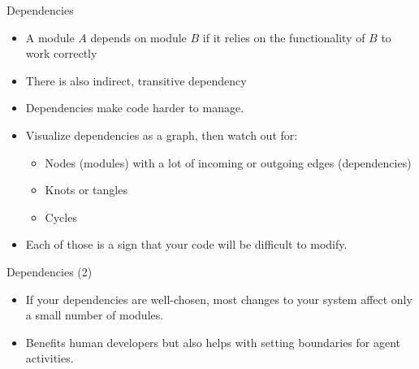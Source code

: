 \documentclass[
ps,
]{prosper}
\begin{document}
\begin{slide}{Dependencies}

\begin{itemize}

\item A module $A$ depends on module $B$ if it relies on the functionality of $B$ to
  work correctly

\item There is also indirect, transitive dependency

\item Dependencies make code harder to manage.

\item Visualize dependencies as a graph, then watch out for:

  \begin{itemize}
  
  \item Nodes (modules) with a lot of incoming or outgoing edges (dependencies)

  \item Knots or tangles

  \item Cycles
    
  \end{itemize}

\item Each of those is a sign that your code will be difficult to modify.
  
\end{itemize}
  
\end{slide}

\begin{slide}{Dependencies (2)}

\begin{itemize}

\item If your dependencies are well-chosen, most changes to your system affect only a small number of modules.

\item Benefits human developers but also helps with setting boundaries for agent activities.

\end{itemize}

\end{slide}
\end{document}
